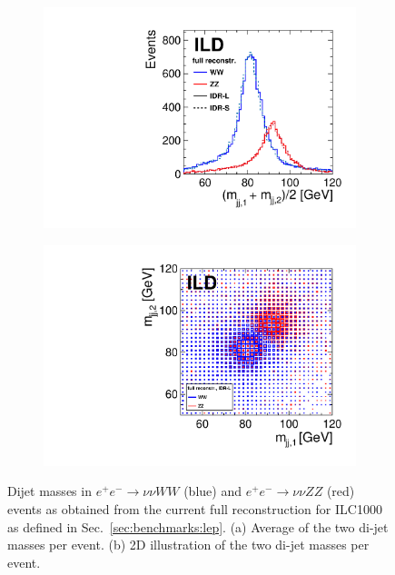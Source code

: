\begin{figure}[htbp]
\begin{subfigure}{0.455\hsize} \includegraphics[width=\textwidth]{Performance/fig/ls_comp_rec_monly.pdf}
 \caption{ \label{fig:qgc:rec:1d}}
 \end{subfigure}
\begin{subfigure}{0.49\hsize} \includegraphics[width=\textwidth]{Performance/fig/m_m_rec.pdf}
 \caption{  \label{fig:qgc:rec:2d}}
 \end{subfigure}
\caption{Dijet masses in $e^+e^- \to \nu\nu WW$ (blue) and $e^+e^- \to \nu\nu ZZ$ (red) events as obtained from the current full reconstruction for ILC1000 as defined in Sec.~\ref{sec:benchmarks:lep}.
(a) Average of the two di-jet masses per event.
(b) 2D illustration of the two di-jet masses per event. 
}
\label{fig:qgc:rec}
\end{figure}


